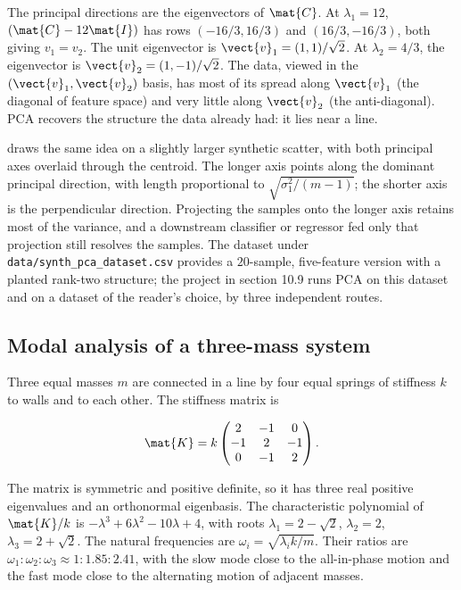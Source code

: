 The principal directions are the eigenvectors of $\mat{C}$. At
$\lambda_{1} = 12$, $(\mat{C} - 12 \mat{I})$ has rows $(-16/3, 16/3)$
and $(16/3, -16/3)$, both giving $v_{1} = v_{2}$. The unit
eigenvector is $\vect{v}_{1} = (1, 1)/\sqrt{2}$. At $\lambda_{2} =
4/3$, the eigenvector is $\vect{v}_{2} = (1, -1)/\sqrt{2}$. The
data, viewed in the $(\vect{v}_{1}, \vect{v}_{2})$ basis, has most
of its spread along $\vect{v}_{1}$ (the diagonal of feature space)
and very little along $\vect{v}_{2}$ (the anti-diagonal). PCA
recovers the structure the data already had: it lies near a line.



 draws the same idea on a slightly
larger synthetic scatter, with both principal axes overlaid through
the centroid. The longer axis points along the dominant principal
direction, with length proportional to $\sqrt{\sigma_{1}^{2}/(m-1)}$;
the shorter axis is the perpendicular direction. Projecting the
samples onto the longer axis retains most of the variance, and a
downstream classifier or regressor fed only that projection still
resolves the samples. The dataset under
\texttt{data/synth\_pca\_dataset.csv} provides a $20$-sample,
five-feature version with a planted rank-two structure; the project
in section 10.9 runs PCA on this dataset and on a dataset of the
reader's choice, by three independent routes.

\subsection{Modal analysis of a three-mass system}

Three equal masses $m$ are connected in a line by four equal springs
of stiffness $k$ to walls and to each other. The stiffness matrix
is

\[
\mat{K} = k \begin{pmatrix} 2 & -1 & 0 \\ -1 & 2 & -1 \\ 0 & -1 & 2
\end{pmatrix}.
\]

The matrix is symmetric and positive definite, so it has three
real positive eigenvalues and an orthonormal eigenbasis. The
characteristic polynomial of $\mat{K}/k$ is $-\lambda^{3} + 6
\lambda^{2} - 10 \lambda + 4$, with roots $\lambda_{1} = 2 -
\sqrt{2}$, $\lambda_{2} = 2$, $\lambda_{3} = 2 + \sqrt{2}$. The
natural frequencies are $\omega_{i} = \sqrt{\lambda_{i} k/m}$. Their
ratios are $\omega_{1} : \omega_{2} : \omega_{3} \approx 1 : 1.85
: 2.41$, with the slow mode close to the all-in-phase motion and
the fast mode close to the alternating motion of adjacent masses.


